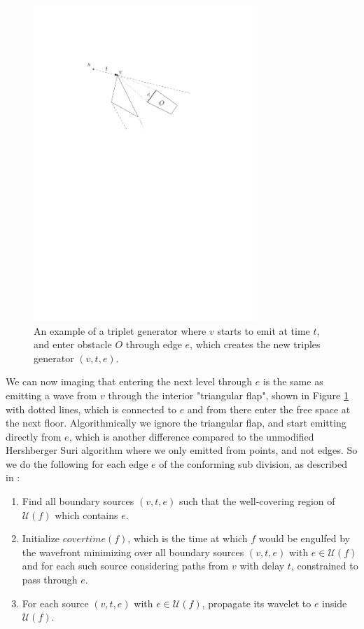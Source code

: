 \begin{figure}[H]
	\centering
	\includegraphics[width=0.75\textwidth]{figures/tripletgenerator.pdf}
	\caption{An example of a triplet generator where $v$ starts to emit at time $t$, and enter obstacle $O$ through edge $e$, which 
	         creates the new triples generator $(v,t,e)$. }
	\label{fig:tripletgenerator}
\end{figure}

We can now imaging that entering the next level through $e$ is the same as emitting a wave from $v$ through the interior "triangular 
flap", shown in Figure \ref{fig:tripletgenerator} with dotted lines, which is connected to $e$ and from there enter the free space at the 
next floor. Algorithmically we ignore the triangular flap, and start emitting directly from $e$, which is another difference compared to 
the unmodified Hershberger Suri algorithm where we only emitted from points, and not edges. So we do the following for each edge $e$ of 
the conforming sub division, as described in \cite{HershbergerKS17}:

\begin{enumerate}
    \item Find all boundary sources $(v,t,e)$ such that the well-covering region of $\mathcal{U}(f)$ which contains $e$.
    \item Initialize $covertime(f)$, which is the time at which $f$ would be engulfed by the wavefront minimizing over all boundary 
          sources $(v,t,e)$ with $e \in \mathcal{U}(f)$ and for each such source considering paths from $v$ with delay $t$, constrained to
          pass through $e$.
    \item For each source $(v,t,e)$ with $e \in \mathcal{U}(f)$, propagate its wavelet to $e$ inside $\mathcal{U}(f)$.
\end{enumerate}


